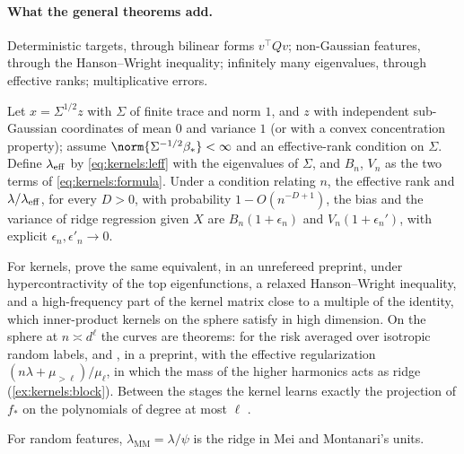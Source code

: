 \begin{refsection}
\paragraph{What the general theorems add.} Deterministic targets, through bilinear forms $v^\top Qv$; non-Gaussian features, through the Hanson--Wright inequality; infinitely many eigenvalues, through effective ranks; multiplicative errors.

\begin{theorem}\label{thm:kernels:cm}
Let $x=\Sigma^{1/2}z$ with $\Sigma$ of finite trace and norm $1$, and $z$ with independent sub-Gaussian coordinates of mean $0$ and variance $1$ (or with a convex concentration property); assume $\norm{\Sigma^{-1/2}\beta_*}<\infty$ and an effective-rank condition on $\Sigma$. Define $\lambda_{\mathrm{eff}}$ by \eqref{eq:kernels:leff} with the eigenvalues of $\Sigma$, and $B_n$, $V_n$ as the two terms of \eqref{eq:kernels:formula}. Under a condition relating $n$, the effective rank and $\lambda/\lambda_{\mathrm{eff}}$, for every $D>0$, with probability $1-O(n^{-D+1})$, the bias and the variance of ridge regression given $X$ are $B_n(1+\epsilon_n)$ and $V_n(1+\epsilon_n')$, with explicit $\epsilon_n,\epsilon'_n\to0$.
\end{theorem}

For kernels, \textcite{MisiakiewiczSaeed2024} prove the same equivalent, in an unrefereed preprint, under hypercontractivity of the top eigenfunctions, a relaxed Hanson--Wright inequality, and a high-frequency part of the kernel matrix close to a multiple of the identity, which inner-product kernels on the sphere satisfy in high dimension. On the sphere at $n\asymp d^\ell$ the curves are theorems: \textcite[Theorem~2]{XiaoEtAl2023} for the risk averaged over isotropic random labels, and \textcite{Misiakiewicz2022}, in a preprint, with the effective regularization $(n\lambda+\mu_{>\ell})/\mu_\ell$, in which the mass of the higher harmonics acts as ridge (\cref{ex:kernels:block}). Between the stages the kernel learns exactly the projection of $f_*$ on the polynomials of degree at most $\ell$ \parencite[Thm.~4]{GhorbaniEtAl2021}.

For random features, $\lambda_{\mathrm{MM}}=\lambda/\psi$ is the ridge in Mei and Montanari's units.


\end{refsection}
